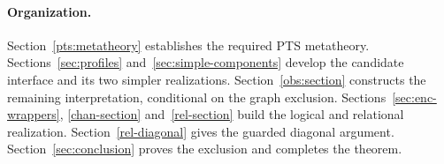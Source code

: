 \paragraph{Organization.}
Section~\ref{pts:metatheory} establishes the required PTS metatheory.
Sections~\ref{sec:profiles} and~\ref{sec:simple-components} develop the
candidate interface and its two simpler realizations.
Section~\ref{obs:section} constructs the remaining interpretation,
conditional on the graph exclusion. Sections~\ref{sec:enc-wrappers},
\ref{chan-section} and~\ref{rel-section} build the logical and relational
realization. Section~\ref{rel-diagonal} gives the guarded diagonal
argument. Section~\ref{sec:conclusion} proves the exclusion and completes
the theorem.
